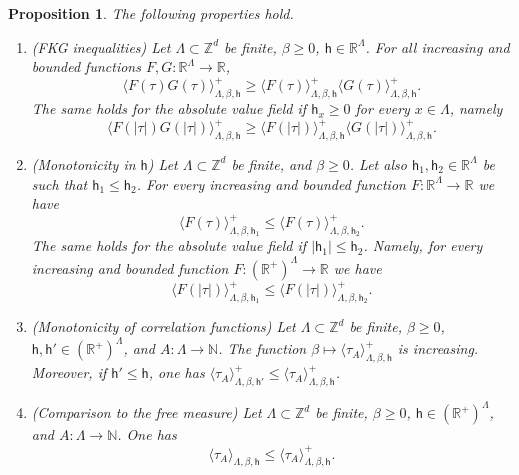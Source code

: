 \documentclass[11pt,a4paper]{article}
\numberwithin{equation}{section}
\theoremstyle{plain}
\newtheorem{Prop}[Thm]{Proposition}
\theoremstyle{definition}
\begin{document}
\begin{Prop}\label{prop: monot plus} The following properties hold.
\begin{enumerate}
    \item[$\bullet$] \textup{(FKG inequalities)} Let $\Lambda \subset \mathbb Z^d$ be finite, $\beta \geq 0$, $\mathsf h \in \mathbb R^\Lambda$. For all increasing and bounded functions $F,G:\mathbb R^\Lambda \rightarrow \mathbb R$,
    \begin{equation}
    \langle F(\tau) G(\tau) \rangle_{\Lambda,\beta, \mathsf h}^+ \geq \langle F(\tau) \rangle_{\Lambda,\beta,\mathsf h}^+  \langle G(\tau) \rangle_{\Lambda,\beta,\mathsf h}^+. 
    \end{equation}
    The same holds for the absolute value field if $\mathsf h_x \geq 0$ for every $x \in \Lambda$, namely
\begin{equation}
    \langle F(|\tau|)G(|\tau|) \rangle_{\Lambda,\beta,\mathsf{h}}^+\geq \langle F(|\tau|) \rangle_{\Lambda,\beta,\mathsf{h}}^+ \langle G(|\tau|) \rangle_{\Lambda,\beta,\mathsf{h}}^+.
\end{equation}
\item[$\bullet$] \textup{(Monotonicity in $\mathsf{h}$)} Let $\Lambda \subset \mathbb Z^d$ be finite, and $\beta\geq0$. Let also  $\mathsf{h}_1,\mathsf{h}_2\in \mathbb R^\Lambda$ be such that $\mathsf{h}_1\leq \mathsf{h}_2$. For every increasing and bounded function $F:\mathbb{R}^{\Lambda}\to\mathbb{R}$ we have 
\begin{equation}
\langle F(\tau) \rangle_{\Lambda,\beta,\mathsf{h}_1}^+\leq \langle F(\tau) \rangle_{\Lambda,\beta,\mathsf{h}_2}^+.  
\end{equation}
The same holds for the absolute value field if $|\mathsf{h}_1| \leq \mathsf{h}_2$. Namely, for every increasing and bounded function $F: (\mathbb{R}^+)^{\Lambda}\to\mathbb{R}$ we have 
\begin{equation}
\langle F(|\tau|) \rangle_{\Lambda,\beta,\mathsf{h}_1}^+\leq \langle F(|\tau|) \rangle_{\Lambda,\beta,\mathsf{h}_2}^+.  
\end{equation}
\item[$\bullet$] \textup{(Monotonicity of correlation functions)} Let $\Lambda \subset \mathbb Z^d$ be finite, $\beta\geq0$, $\mathsf{h},\mathsf{h}'\in (\mathbb R^+)^\Lambda$, and $A: \Lambda\to \mathbb{N}$. The function
$\beta \mapsto \langle \tau_A\rangle_{\Lambda,\beta,\mathsf{h}}^+$ is increasing. Moreover, if $\mathsf{h}'\leq \mathsf{h}$, one has $\langle \tau_A\rangle_{\Lambda,\beta,\mathsf{h}'}^+\leq \langle \tau_A\rangle_{\Lambda,\beta,\mathsf{h}}^+$.
\item[$\bullet$] \textup{(Comparison to the free measure)} Let $\Lambda \subset \mathbb Z^d$ be finite, $\beta\geq0$, $\mathsf{h}\in (\mathbb R^+)^\Lambda$, and $A: \Lambda\to \mathbb{N}$. One has
\begin{equation}
    \langle \tau_A\rangle_{\Lambda,\beta,\mathsf{h}}\leq \langle \tau_A\rangle^+_{\Lambda,\beta,\mathsf{h}}.
\end{equation}
\end{enumerate}
\end{Prop}
\end{document}
